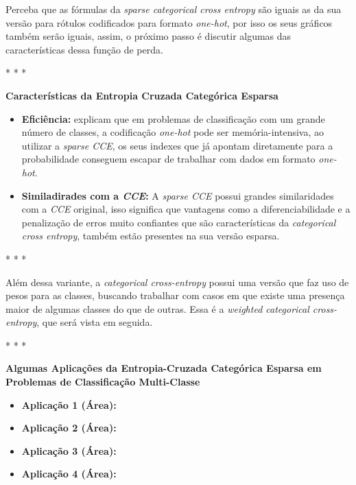 Perceba que as fórmulas da \textit{sparse categorical cross entropy} são iguais as da sua versão para rótulos codificados para formato \textit{one-hot}, por isso os seus gráficos também serão iguais, assim, o próximo passo é discutir algumas das características dessa função de perda.

\medskip
\begin{center}
 * * *
\end{center}
\medskip

\textbf{Características da Entropia Cruzada Categórica Esparsa}
\vspace{1em}

\begin{itemize}
    \item \textbf{Eficiência:} \textcite{LossesArticle} explicam que em problemas de classificação com um grande número de classes, a codificação \textit{one-hot} pode ser memória-intensiva, ao utilizar a \textit{sparse CCE}, os seus indexes que já apontam diretamente para a probabilidade conseguem escapar de trabalhar com dados em formato \textit{one-hot}.
    \item \textbf{Similadirades com a \textit{CCE}:} A \textit{sparse CCE} possui grandes similaridades com a \textit{CCE} original, isso significa que vantagens como a diferenciabilidade e a penalização de erros muito confiantes que são características da \textit{categorical cross entropy}, também estão presentes na sua versão esparsa.
\end{itemize}

\medskip
\begin{center}
 * * *
\end{center}
\medskip

Além dessa variante, a \textit{categorical cross-entropy} possui uma versão que faz uso de pesos para as classes, buscando trabalhar com casos em que existe uma presença maior de algumas classes do que de outras. Essa é a \textit{weighted categorical cross-entropy}, que será vista em seguida.

\medskip
\begin{center}
 * * *
\end{center}
\medskip

\textbf{Algumas Aplicações da Entropia-Cruzada Categórica Esparsa em Problemas de Classificação Multi-Classe}
\vspace{1em}

\begin{itemize}
    \item \textbf{Aplicação 1 (Área):}
    \item \textbf{Aplicação 2 (Área):}
    \item \textbf{Aplicação 3 (Área):}
    \item \textbf{Aplicação 4 (Área):}
\end{itemize}

